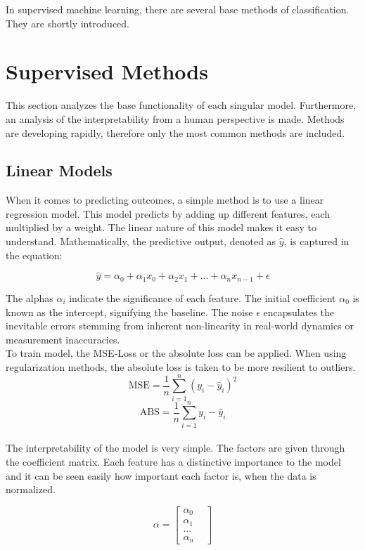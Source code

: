 In supervised machine learning, there are several base methods of classification. They are shortly introduced.

\section{Supervised Methods}

This section analyzes the base functionality of each singular model. Furthermore, an analysis of the interpretability from a human perspective is made. Methods are developing rapidly, therefore only the most common methods are included.

\subsection{Linear Models}
When it comes to predicting outcomes, a simple method is to use a linear regression model. This model predicts by adding up different features, each multiplied by a weight. The linear nature of this model makes it easy to understand. Mathematically, the predictive output, denoted as $\hat{y}$, is  captured in the equation:

$$ \hat{y}= \alpha_0 + \alpha_1 x_0 + \alpha_2 x_1 +... +\alpha_n x_{n-1} + \epsilon$$

The alphas $\alpha_i$ indicate the significance of each feature. The initial coefficient $\alpha_0$ is known as the intercept, signifying the baseline.  The noise $\epsilon$ encapsulates the inevitable errors stemming from inherent non-linearity in real-world dynamics or measurement inaccuracies.
\\
To train model, the MSE-Loss or the absolute loss can be applied. When using regularization methods, the absolute loss is taken to be more resilient to outliers.
$$ \text{MSE} = \frac{1}{n} \sum_{i=1}^{n} (y_i - \hat{y}_i)^2$$
$$ \text{ABS} = \frac{1}{n} \sum_{i=1}^{n} y_i - \hat{y}_i$$
\\
The interpretability of the model is very simple. The factors are given through the coefficient matrix. Each feature has a distinctive importance to the model and it can be seen easily how important each factor is, when the data is normalized. 

$$ \alpha = \begin{bmatrix}
	\alpha_0 & \\
	\alpha_1 & \\
	... & \\
	\alpha_n &
\end{bmatrix}
$$

